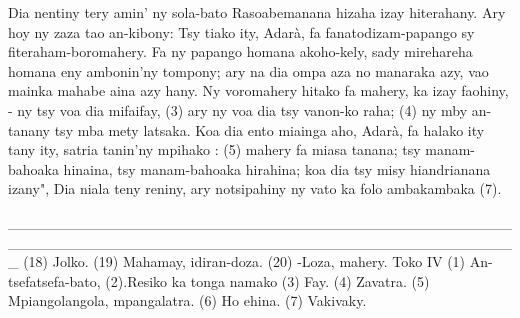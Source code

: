 Dia nentiny tery amin' ny sola-bato Rasoabemanana hizaha izay hiterahany. 
Ary hoy ny zaza tao an-kibony: Tsy tiako ity, Adarà, fa fanatodizam-papango sy fiteraham-boromahery. 
Fa ny papango homana akoho-kely, sady mirehareha homana eny ambonin'ny tompony; ary na dia ompa
aza no manaraka azy, vao mainka mahabe aina azy hany. Ny voromahery
hitako fa mahery, ka izay faohiny, - ny tsy voa dia mifaifay, (3) ary ny voa
dia tsy vanon-ko raha; (4) ny mby an-tanany tsy mba mety latsaka. Koa
dia ento miainga aho, Adarà, fa halako ity tany ity, satria tanin'ny mpihako : (5) mahery fa miasa tanana; 
tsy manam-bahoaka hinaina, tsy manam-bahoaka hirahina; koa dia tsy misy hiandrianana izany", 
Dia niala teny reniny, ary notsipahiny ny vato ka folo ambakambaka (7).

_________________________________________________________________________________________________
(18) Jolko. 
(19) Mahamay, idiran-doza. 
(20) -Loza, mahery.
Toko IV (1) An-tsefatsefa-bato, 
(2).Resiko ka tonga namako 
(3) Fay. 
(4) Zavatra.
(5) Mpiangolangola, mpangalatra. 
(6) Ho ehina. 
(7) Vakivaky.